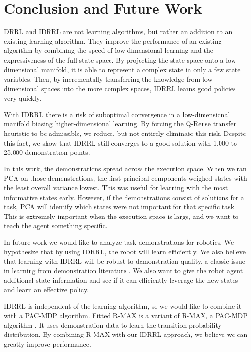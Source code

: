 \documentclass[10pt,a4paper]{article}
\begin{document}
\section{Conclusion and Future Work}
DRRL and IDRRL are not learning algorithms, but rather an addition to an existing learning algorithm. They improve the performance of an existing algorithm by combining the speed of low-dimensional learning and the expressiveness of the full state space. By projecting the state space onto a low-dimensional manifold, it is able to represent a complex state in only a few state variables. Then, by incrementally transferring the knowledge from low-dimensional spaces into the more complex spaces, IDRRL learns good policies very quickly. 

With IDRRL there is a risk of suboptimal convergence in a low-dimensional manifold biasing higher-dimensional learning. By forcing the Q-Reuse transfer heuristic to be admissible, we reduce, but not entirely eliminate this risk. Despite this fact, we show that IDRRL still converges to a good solution with 1,000 to 25,000 demonstration points.

In this work, the demonstrations spread across the execution space. When we ran PCA on those demonstrations, the first principal components weighed states with the least overall variance lowest. This was useful for learning with the most informative states early. However, if the demonstrations consist of solutions for a task, PCA will identify which states were not important for that specific task. This is extremely important when the execution space is large, and we want to teach the agent something specific.

In future work we would like to analyze task demonstrations for robotics. We hypothesize that by using IDRRL, the robot will learn efficiently. We also believe that learning with IDRRL will be robust to demonstration quality, a classic issue in learning from demonstration literature \cite{Argall:2009:SRL:1523530.1524008}. We also want to give the robot agent additional state information and see if it can efficiently leverage the new states and learn an effective policy.

IDRRL is independent of the learning algorithm, so we would like to combine it with a PAC-MDP algorithm. Fitted R-MAX is a variant of R-MAX, a PAC-MDP algorithm \cite{SARA07-jong}. It uses demonstration data to learn the transition probability distribution. By combining R-MAX with our IDRRL approach, we believe we can greatly improve performance.




\end{document}
